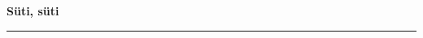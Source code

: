 \documentclass[10pt]{book}
\begin{document}
{
  \samepage
  \raggedbottom
  \raggedright
  \sloppy


  \vspace{0.2in}

  \noindent\begin{minipage}{.1\textwidth}
    \hfill\vspace{0.1in}
  \end{minipage}%
  \noindent\begin{minipage}{.8\textwidth}
    \centering
    \bfseries
    \large S\"uti, s\"uti
  \end{minipage}%
  \noindent\begin{minipage}{.1\textwidth}
      \hfill\vspace{0.1in}
  \end{minipage}

  \nopagebreak[4]
  \vspace{0.1in}
  \nopagebreak[4]
  \hrule height 0.05ex
  \nopagebreak[4]
  \vspace{-0.05in}




}
\end{document}

